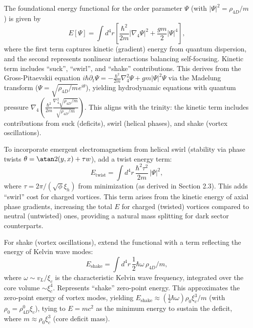 The foundational energy functional for the order parameter $\Psi$ (with $|\Psi|^2 = \rho_{4D}/m$) is given by
\begin{equation}
E[\Psi] = \int d^4 r \left[ \frac{\hbar^2}{2m} |\nabla_4 \Psi|^2 + \frac{g m}{2} |\Psi|^4 \right],
\end{equation}
where the first term captures kinetic (gradient) energy from quantum dispersion, and the second represents nonlinear interactions balancing self-focusing. Kinetic term includes ``suck'', ``swirl'', and ``shake'' contributions. This derives from the Gross-Pitaevskii equation $i \hbar \partial_t \Psi = -\frac{\hbar^2}{2 m} \nabla_4^2 \Psi + g m |\Psi|^2 \Psi$ via the Madelung transform ($\Psi = \sqrt{\rho_{4D}/m} e^{i \theta}$), yielding hydrodynamic equations with quantum pressure $\nabla_4 \left( \frac{\hbar^2}{2 m} \frac{\nabla_4^2 \sqrt{\rho_{4D}/m}}{\sqrt{\rho_{4D}/m}} \right)$. This aligns with the trinity: the kinetic term includes contributions from suck (deficits), swirl (helical phases), and shake (vortex oscillations).

To incorporate emergent electromagnetism from helical swirl (stability via phase twists $\theta = \atan2(y, x) + \tau w$), add a twist energy term:
\begin{equation}
E_{\text{twist}} = \int d^4 r \, \frac{\hbar^2 \tau^2}{2m} \, |\Psi|^2,
\end{equation}
where $\tau = 2\pi / (\sqrt{\phi} \xi_h)$ from minimization (as derived in Section 2.3). This adds ``swirl'' cost for charged vortices. This term arises from the kinetic energy of axial phase gradients, increasing the total $E$ for charged (twisted) vortices compared to neutral (untwisted) ones, providing a natural mass splitting for dark sector counterparts.

For shake (vortex oscillations), extend the functional with a term reflecting the energy of Kelvin wave modes:
\begin{equation}
E_{\text{shake}} = \int d^4 r \, \frac{1}{2} \hbar \omega \, \rho_{4D} / m,
\end{equation}
where $\omega \sim v_L / \xi_c$ is the characteristic Kelvin wave frequency, integrated over the core volume $\sim \xi_c^4$. Represents ``shake'' zero-point energy. This approximates the zero-point energy of vortex modes, yielding $E_{\text{shake}} \approx (\frac{1}{2} \hbar \omega) \rho_0 \xi_c^3 / m$ (with $\rho_0 = \rho_{4D}^0 \xi_c$), tying to $E = m c^2$ as the minimum energy to sustain the deficit, where $m \approx \rho_0 \xi_c^3$ (core deficit mass).

